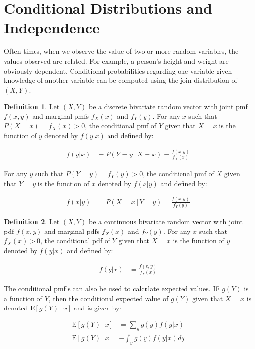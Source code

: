 \documentclass[11pt,a4paper]{report}
\theoremstyle{definition}
\newtheorem{defn}{Definition}[section]
\theoremstyle{theorem}
\theoremstyle{example}
\begin{document}
\section{Conditional Distributions and Independence}

Often times, when we observe the value of two or more random variables, the values observed are related.  For example, a person's height and weight are obviously dependent.  Conditional probabilities regarding one variable given knowledge of another variable can be computed using the join distribution of $(X,Y)$.

\begin{defn}
  Let $(X,Y)$ be a discrete bivariate random vector with joint pmf $f(x,y)$ and marginal pmfs $f_X(x)$ and $f_Y(y)$.  For any $x$ such that $P(X = x) = f_X(x) > 0$, the conditional pmf of $Y$ given that $X = x$ is the function of $y$ denoted by $f(y|x)$ and defined by:

  \begin{align*}
    f(y|x) &= P(Y = y \, | \, X = x) = \frac{f(x,y)}{f_X(x)}
  \end{align*}

For any $y$ such that $P(Y = y) = f_Y(y) > 0$, the conditional pmf of $X$ given that $Y = y$ is the function of $x$ denoted by $f(x|y)$ and defined by:

\begin{align*}
  f(x|y) &= P(X = x \, | \, Y = y) = \frac{f(x,y)}{f_Y(y)}
\end{align*}

\end{defn}

\begin{defn}
Let $(X,Y)$ be a continuous bivariate random vector with joint pdf $f(x,y)$ and marginal pdfs $f_X(x)$ and $f_Y(y)$.  For any $x$ such that $f_X(x) > 0$, the conditional pdf of $Y$ given that $X = x$ is the function of $y$ denoted by $f(y|x)$ and defined by:

\begin{align*}
  f(y|x) &= \frac{f(x,y)}{f_X(x)}
\end{align*}

\end{defn}

The conditional pmf's can also be used to calculate expected values.  IF $g(Y)$ is a function of $Y$, then the conditional expected value of $g(Y)$ given that $X = x$ is denoted $\mathrm{E}\left[g(Y) \, | \, x \right]$ and is given by:

\begin{align*}
  \mathrm{E}\left[g(Y) \, | \, x \right] &= \sum_y g(y) f(y|x) \\
  \mathrm{E}\left[g(Y) \, | \, x \right] &- \int_y g(y) f(y|x) dy
\end{align*}
\end{document}
